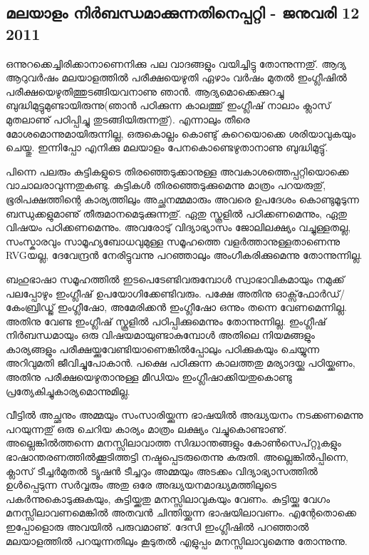 \subsection*{മലയാളം നിര്‍ബന്ധമാക്കുന്നതിനെപ്പറ്റി  - ജനുവരി 12 2011 }

ഒന്നുറക്കെച്ചിരിക്കാനാണെനിക്കു പല വാദങ്ങളും വയിച്ചിട്ടു തോന്നുന്നതു്.
ആദ്യ ആറുവര്‍ഷം മലയാളത്തില്‍ പരീക്ഷയെഴുതി ഏഴാം വര്‍ഷം മുതല്‍
ഇംഗ്ലീഷില്‍ പരീക്ഷയെഴുതിത്തുടങ്ങിയവനാണു ഞാന്‍. ആദ്യമൊക്കെക്കുറച്ചു
ബുദ്ധിമുട്ടുമുണ്ടായിരുന്നു(ഞാന്‍ പഠിക്കുന്ന കാലത്തു് ഇംഗ്ലീഷ് നാലാം
ക്ലാസ് മുതലാണു് പഠിപ്പിച്ചു തുടങ്ങിയിരുന്നതു്). എന്നാലും തീരെ
മോശമൊന്നുമായിരുന്നില്ല, ഒരുകൊല്ലം കൊണ്ടു് കുറെയൊക്കെ ശരിയാവുകയും
ചെയ്തു. ഇന്നിപ്പോ എനിക്കു മലയാളം പേനകൊണ്ടെഴുതാനാണു ബുദ്ധിമുട്ടു്.

പിന്നെ പലരും കുട്ടികളുടെ തിരഞ്ഞെടുക്കാനുള്ള അവകാശത്തെപ്പറ്റിയൊക്കെ
വാചാലരാവുന്നതുകണ്ടു. കുട്ടികള്‍ തിരഞ്ഞെടുക്കുമെന്നു മാത്രം പറയരുതു്,
ഭൂരിപക്ഷത്തിന്റെ കാര്യത്തിലും അച്ഛനമ്മമാരും അവരെ ഉപദേശം കൊണ്ടുമൂടുന്ന
ബന്ധുക്കളുമാണു് തീരുമാനമെടുക്കുന്നതു്. ഏതു സ്കൂളില്‍ പഠിക്കണമെന്നും,
ഏതു വിഷയം പഠിക്കണമെന്നും. അവരോടു് വിദ്യാഭ്യാസം ജോലിലക്ഷ്യം
വച്ചുള്ളതല്ല, സംസ്കാരവും സാമൂഹ്യബോധവുമുള്ള സമൂഹത്തെ
വളര്‍ത്താനുള്ളതാണെന്നു RVGയല്ല, ദേവേന്ദ്രന്‍ നേരിട്ടുവന്നു പറഞ്ഞാലും
അംഗീകരിക്കുമെന്നു തോന്നുന്നില്ല.

ബഹുഭാഷാ സമൂഹത്തില്‍ ഇടപെടേണ്ടിവരുമ്പോള്‍ സ്വാഭാവികമായും നമുക്ക്
പലപ്പോഴും ഇംഗ്ലീഷ് ഉപയോഗിക്കേണ്ടിവരും. പക്ഷേ അതിനു
ഓക്സ്‌ഫോര്‍ഡ്/കേംബ്രിഡ്ജ് ഇംഗ്ലീഷോ, അമേരിക്കന്‍ ഇംഗ്ലീഷോ ഒന്നും തന്നെ
വേണമെന്നില്ല. അതിനു വേണ്ട ഇംഗ്ലീഷ് സ്കൂളില്‍ പഠിപ്പിക്കുമെന്നും
തോന്നുന്നില്ല. ഇംഗ്ലീഷ് നിര്‍ബന്ധമായും ഒരു വിഷയമായുണ്ടാകുമ്പോള്‍ അതിലെ
നിയമങ്ങളും കാര്യങ്ങളും പരീക്ഷയ്ക്കുവേണ്ടിയാണെങ്കില്‍പ്പോലും
പഠിക്കുകയും ചെയ്യുന്ന അറിവുമതി ജീവിച്ചുപോകാന്‍. പക്ഷെ പഠിക്കുന്ന
കാലത്തതു മര്യാദയ്ക്കു പഠിയ്ക്കണം, അതിനു പരീക്ഷയെഴുതാനുള്ള മീഡിയം
ഇംഗ്ലീഷാക്കിയതുകൊണ്ടു പ്രത്യേകിച്ചുകാര്യമൊന്നുമില്ല.

വീട്ടില്‍ അച്ഛനും അമ്മയും സംസാരിയ്ക്കുന്ന ഭാഷയില്‍ അദ്ധ്യയനം
നടക്കണമെന്നു പറയുന്നതു് ഒരു ചെറിയ കാര്യം മാത്രം ലക്ഷ്യം
വച്ചുകൊണ്ടാണു്. അല്ലെങ്കില്‍ത്തന്നെ മനസ്സിലാവാത്ത സിദ്ധാന്തങ്ങളും
കോണ്‍സെപ്റ്റുകളും ഭാഷാന്തരണത്തില്‍ക്കൂടിത്തട്ടി നഷ്ടപ്പെടരുതെന്നു
കരുതി. അല്ലെങ്കില്‍പ്പിന്നെ, ക്ലാസ് ടീച്ചര്‍മുതല്‍ ട്യൂഷന്‍ ടീച്ചറും
അമ്മയും അടക്കം വിദ്യാഭ്യാസത്തില്‍ ഉള്‍പ്പെടുന്ന സര്‍വ്വരും അതു ഒരേ
അദ്ധ്യയനമാദ്ധ്യമത്തിലൂടെ പകര്‍ന്നുകൊടുക്കുകയും, കുട്ടിയ്ക്കതു
മനസ്സിലാവുകയും വേണം. കുട്ടിയ്ക്കു വേഗം മനസ്സിലാവണമെങ്കില്‍ അതവന്‍
ചിന്തിയ്ക്കുന്ന ഭാഷയിലാവണം. എന്റേതൊക്കെ ഇപ്പോളൊരു അവയില്‍ പരുവമാണു്.
ദേസി ഇംഗ്ലീഷില്‍ പറഞ്ഞാല്‍ മലയാളത്തില്‍ പറയുന്നതിലും കൂടുതല്‍ എളുപ്പം
മനസ്സിലാവുമെന്നു തോന്നുന്നു.

